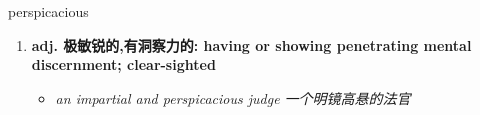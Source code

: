 
\begin{frame}
{\huge perspicacious}
\begin{center}
\begin{enumerate}\Large
  \item \textbf{adj. 极敏锐的,有洞察力的: having or showing penetrating mental discernment; clear-sighted}
  \begin{itemize}
    \item \em{\Large{an impartial and perspicacious judge 一个明镜高悬的法官}}
  \end{itemize}
\end{enumerate}
\end{center}
\end{frame}
